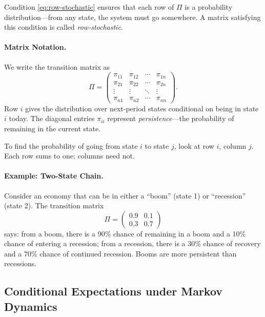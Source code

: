 Condition \eqref{eq:row-stochastic} ensures that each row of $\Pi$ is a probability distribution---from any state, the system must go somewhere. A matrix satisfying this condition is called \emph{row-stochastic}.

\paragraph{Matrix Notation.}
We write the transition matrix as
\begin{equation}
\Pi = \begin{pmatrix}
\pi_{11} & \pi_{12} & \cdots & \pi_{1n} \\
\pi_{21} & \pi_{22} & \cdots & \pi_{2n} \\
\vdots & \vdots & \ddots & \vdots \\
\pi_{n1} & \pi_{n2} & \cdots & \pi_{nn}
\end{pmatrix}.
\label{eq:transition-matrix}
\end{equation}
Row $i$ gives the distribution over next-period states conditional on being in state $i$ today. The diagonal entries $\pi_{ii}$ represent \emph{persistence}---the probability of remaining in the current state.

\begin{calloutnote}
To find the probability of going from state $i$ to state $j$, look at row $i$, column $j$. Each row sums to one; columns need not.
\end{calloutnote}

\paragraph{Example: Two-State Chain.}
Consider an economy that can be in either a ``boom'' (state 1) or ``recession'' (state 2). The transition matrix
\begin{equation}
\Pi = \begin{pmatrix}
0.9 & 0.1 \\
0.3 & 0.7
\end{pmatrix}
\label{eq:two-state-example}
\end{equation}
says: from a boom, there is a 90\% chance of remaining in a boom and a 10\% chance of entering a recession; from a recession, there is a 30\% chance of recovery and a 70\% chance of continued recession. Booms are more persistent than recessions.

\subsection{Conditional Expectations under Markov Dynamics}
\label{subsec:conditional-expectation}

